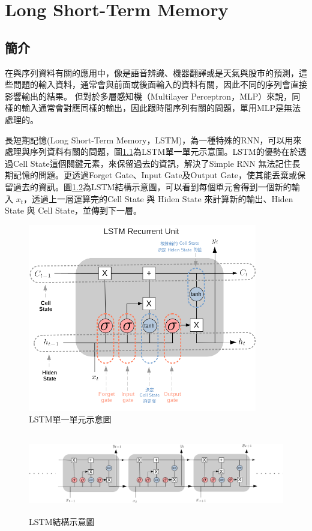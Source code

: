 \chapter{Long Short-Term Memory}
\label{chapter:lstm}
\section{簡介}
\label{sec:LstmIntroduction}


在與序列資料有關的應用中，像是語音辨識、機器翻譯或是天氣與股市的預測，這些問題的輸入資料，通常會與前面或後面輸入的資料有關，因此不同的序列會直接影響輸出的結果。
但對於多層感知機（Multilayer Perceptron，MLP）來說，同樣的輸入通常會對應同樣的輸出，因此跟時間序列有關的問題，單用MLP是無法處理的。

長短期記憶(Long Short-Term Memory，LSTM)，為一種特殊的RNN，可以用來處理與序列資料有關的問題，圖\ref{fig:LstmUnit}為LSTM單一單元示意圖。LSTM的優勢在於透過Cell State這個關鍵元素，來保留過去的資訊，解決了Simple RNN 無法記住長期記憶的問題。更透過Forget Gate、Input Gate及Output Gate，使其能丢棄或保留過去的資訊。圖\ref{fig:LstmArchiture}為LSTM結構示意圖，可以看到每個單元會得到一個新的輸入 \(x_t\)，透過上一層運算完的Cell State 與 Hiden State 來計算新的輸出、Hiden State 與 Cell State，並傳到下一層。

\begin{figure}[h]
	\centering
	\includegraphics[width=10cm]{./pic/qpImeDw4.png}
	\caption{LSTM單一單元示意圖}
	\label{fig:LstmUnit}
\end{figure}


\begin{figure}[h]
	\centering
	\includegraphics[height=3.5cm]{./pic/rDEsxEUS.png}
	\caption{LSTM結構示意圖}
	\label{fig:LstmArchiture}
\end{figure}


